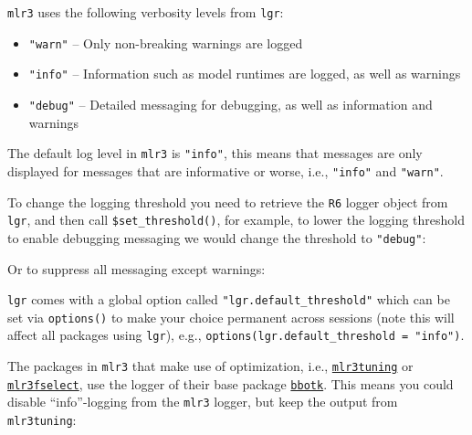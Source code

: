 \texttt{mlr3} uses the following verbosity levels from \texttt{lgr}:

\begin{itemize}
\tightlist
\item
  \texttt{"warn"} -- Only non-breaking warnings are logged
\item
  \texttt{"info"} -- Information such as model runtimes are logged, as
  well as warnings
\item
  \texttt{"debug"} -- Detailed messaging for debugging, as well as
  information and warnings
\end{itemize}

The default log level in \texttt{mlr3} is \texttt{"info"}, this means
that messages are only displayed for messages that are informative or
worse, i.e., \texttt{"info"} and \texttt{"warn"}.

To change the logging threshold you need to retrieve the \texttt{R6}
logger object from \texttt{lgr}, and then call
\texttt{\$set\_threshold()}, for example, to lower the logging threshold
to enable debugging messaging we would change the threshold to
\texttt{"debug"}:

\begin{Shaded}
\begin{Highlighting}[]
\SpecialCharTok{::}\NormalTok{(}\NormalTok{)}\SpecialCharTok{$}\NormalTok{(}\NormalTok{)}
\end{Highlighting}
\end{Shaded}

Or to suppress all messaging except warnings:

\begin{Shaded}
\begin{Highlighting}[]
\SpecialCharTok{::}\NormalTok{(}\NormalTok{)}\SpecialCharTok{$}\NormalTok{(}\NormalTok{)}
\end{Highlighting}
\end{Shaded}

\texttt{lgr} comes with a global option called
\texttt{"lgr.default\_threshold"} which can be set via
\texttt{options()} to make your choice permanent across sessions (note
this will affect all packages using \texttt{lgr}), e.g.,
\texttt{options(lgr.default\_threshold\ =\ "info")}.

The packages in \texttt{mlr3} that make use of optimization, i.e.,
\href{https://mlr3tuning.mlr-org.com}{\texttt{mlr3tuning}}
or
\href{https://mlr3fselect.mlr-org.com}{\texttt{mlr3fselect}},
use the logger of their base package
\href{https://bbotk.mlr-org.com}{\texttt{bbotk}}. This means you could
disable ``info''-logging from the \texttt{mlr3} logger, but keep the
output from \texttt{mlr3tuning}:

